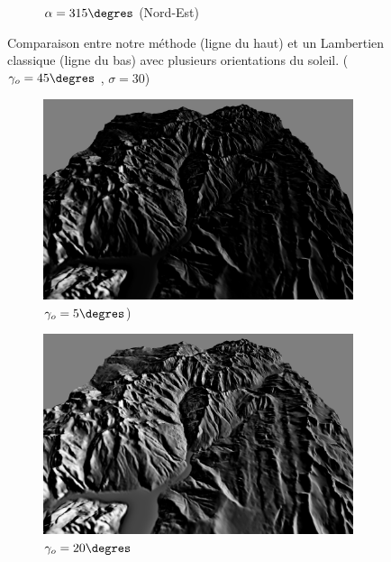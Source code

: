\begin{figure}[h!]
\begin{subfigure}[t]{0.24\linewidth}
   \caption{$\alpha = 315\degres$ (Nord-Est)}
 \end{subfigure}
 \caption{Comparaison entre notre méthode (ligne du haut) et un Lambertien classique (ligne du bas) avec plusieurs orientations du soleil. ( $\gamma_o = 45\degres$ , $\sigma = 30$)}
\end{figure}


\begin{figure}[h!]
\centering
 \begin{subfigure}[t]{0.24\linewidth}
   \centering
   \includegraphics[width=1.0\linewidth]{Resultats/3_our_5.png}
   \caption{$\gamma_o = 5\degres$)}
 \end{subfigure}
 \begin{subfigure}[t]{0.24\linewidth}
   \centering
   \includegraphics[width=1.0\linewidth]{Resultats/3_our_20.png}
   \caption{$\gamma_o = 20\degres$}
 \end{subfigure}
 \begin{subfigure}[t]{0.24\linewidth}

\end{subfigure}
\end{figure}
